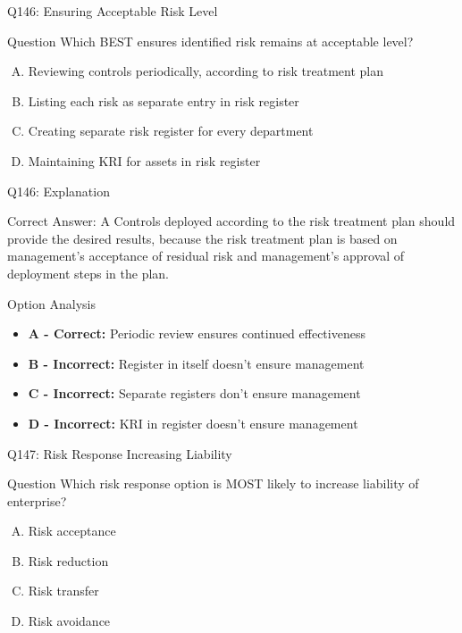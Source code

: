 \documentclass{beamer}
\begin{document}
	\begin{frame}{Q146: Ensuring Acceptable Risk Level}
		\begin{block}{Question}
			Which BEST ensures identified risk remains at acceptable level?
		\end{block}
		\begin{enumerate}[(A)]
			\item Reviewing controls periodically, according to risk treatment plan
			\item Listing each risk as separate entry in risk register
			\item Creating separate risk register for every department
			\item Maintaining KRI for assets in risk register
		\end{enumerate}
	\end{frame}
	
	\begin{frame}{Q146: Explanation}
		\begin{block}{Correct Answer: A}
			Controls deployed according to the risk treatment plan should provide the desired results, because the risk treatment plan is based on management's acceptance of residual risk and management's approval of deployment steps in the plan.
		\end{block}
		\begin{block}{Option Analysis}
			\begin{itemize}
				\item \textbf{A - Correct:} Periodic review ensures continued effectiveness
				\item \textbf{B - Incorrect:} Register in itself doesn't ensure management
				\item \textbf{C - Incorrect:} Separate registers don't ensure management
				\item \textbf{D - Incorrect:} KRI in register doesn't ensure management
			\end{itemize}
		\end{block}
	\end{frame}
	
	\begin{frame}{Q147: Risk Response Increasing Liability}
		\begin{block}{Question}
			Which risk response option is MOST likely to increase liability of enterprise?
		\end{block}
		\begin{enumerate}[(A)]
			\item Risk acceptance
			\item Risk reduction
			\item Risk transfer
			\item Risk avoidance
		\end{enumerate}
	\end{frame}
	
\end{document}
